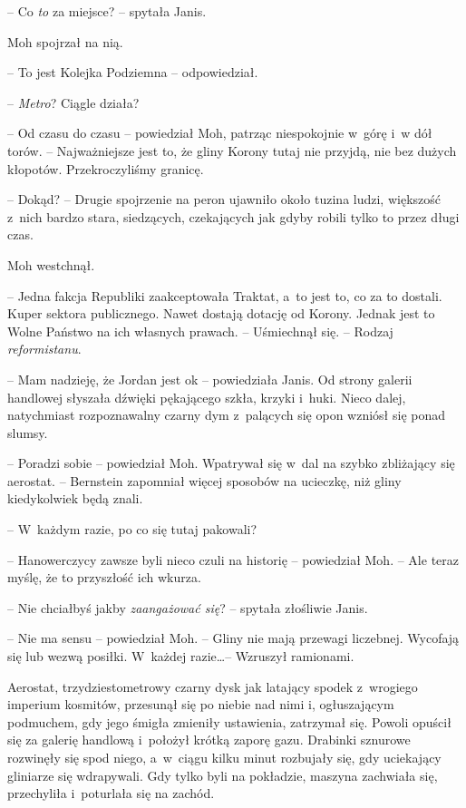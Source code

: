 \documentclass[oneside,polish,11pt,sfheadings]{mwbk}
\begin{document}
-- Co \emph{to} za miejsce? -- spytała Janis.

Moh spojrzał na nią. 

-- To jest Kolejka Podziemna -- odpowiedział.

-- \emph{Metro}? Ciągle działa?

-- Od czasu do czasu -- powiedział Moh, patrząc niespokojnie w~górę i~w dół torów. -- Najważniejsze jest to, że gliny Korony tutaj nie przyjdą,
nie bez dużych kłopotów. Przekroczyliśmy granicę.

-- Dokąd? -- Drugie spojrzenie na peron ujawniło około tuzina ludzi,
większość z~nich bardzo stara, siedzących, czekających jak gdyby robili
tylko to przez długi czas.

Moh westchnął. 

-- Jedna fakcja Republiki zaakceptowała Traktat, a~to jest
to, co za to dostali. Kuper sektora publicznego. Nawet dostają dotację
od Korony. Jednak jest to Wolne Państwo na ich własnych prawach. -- Uśmiechnął się. -- Rodzaj \emph{reformistanu}.

-- Mam nadzieję, że Jordan jest ok -- powiedziała Janis. Od strony galerii
handlowej słyszała dźwięki pękającego szkła, krzyki i~huki. Nieco dalej,
natychmiast rozpoznawalny czarny dym z~palących się opon wzniósł się
ponad slumsy.

-- Poradzi sobie -- powiedział Moh. Wpatrywał się w~dal na szybko
zbliżający się aerostat. -- Bernstein zapomniał więcej sposobów na
ucieczkę, niż gliny kiedykolwiek będą znali.

-- W~każdym razie, po co się tutaj pakowali?

-- Hanowerczycy zawsze byli nieco czuli na historię -- powiedział Moh. -- Ale teraz myślę, że to przyszłość ich wkurza.

-- Nie chciałbyś jakby \emph{zaangażować się}? -- spytała złośliwie Janis.

-- Nie ma sensu -- powiedział Moh. -- Gliny nie mają przewagi liczebnej.
Wycofają się lub wezwą posiłki. W~każdej razie\ldots -- Wzruszył ramionami.

Aerostat, trzydziestometrowy czarny dysk jak latający spodek z~wrogiego
imperium kosmitów, przesunął się po niebie nad nimi i, ogłuszającym
podmuchem, gdy jego śmigła zmieniły ustawienia, zatrzymał się. Powoli
opuścił się za galerię handlową i~położył krótką zaporę gazu. Drabinki
sznurowe rozwinęły się spod niego, a~w~ciągu kilku minut rozbujały się,
gdy uciekający gliniarze się wdrapywali. Gdy tylko byli na pokładzie,
maszyna zachwiała się, przechyliła i~poturlała się na zachód.
\end{document}
